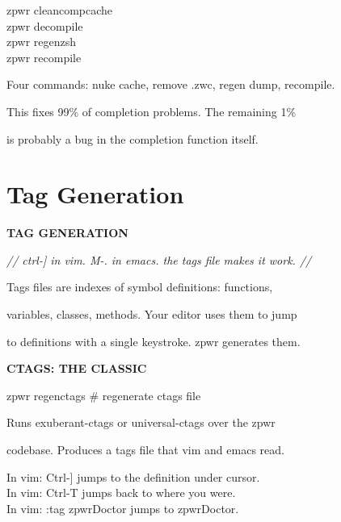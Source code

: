 \documentclass[11pt,a4paper,twoside]{book}
\begin{document}
\begin{codebox}
zpwr cleancompcache\\
zpwr decompile\\
zpwr regenzsh\\
zpwr recompile\\
\end{codebox}

Four commands: nuke cache, remove .zwc, regen dump, recompile.

This fixes 99\% of completion problems. The remaining 1\%

is probably a bug in the completion function itself.


\vspace{16pt}

\section{Tag Generation}


\vspace{10pt}
{\large\bfseries\color{neoncyan} TAG GENERATION}\vspace{6pt}

{\small\itshape\color{dimtext} // ctrl-] in vim. M-. in emacs. the tags file makes it work. //}

Tags files are indexes of symbol definitions: functions,

variables, classes, methods. Your editor uses them to jump

\begin{codebox}
to definitions with a single keystroke. zpwr generates them.\\
\end{codebox}


\vspace{12pt}
{\bfseries\color{neonyellow} CTAGS: THE CLASSIC}\vspace{4pt}

\begin{codebox}
zpwr regenctags                     \# regenerate ctags file\\
\end{codebox}

Runs exuberant-ctags or universal-ctags over the zpwr

\begin{codebox}
codebase. Produces a tags file that vim and emacs read.\\
\end{codebox}

\begin{codebox}
In vim: Ctrl-] jumps to the definition under cursor.\\
In vim: Ctrl-T jumps back to where you were.\\
In vim: :tag zpwrDoctor jumps to zpwrDoctor.\\
\end{codebox}
\end{document}
